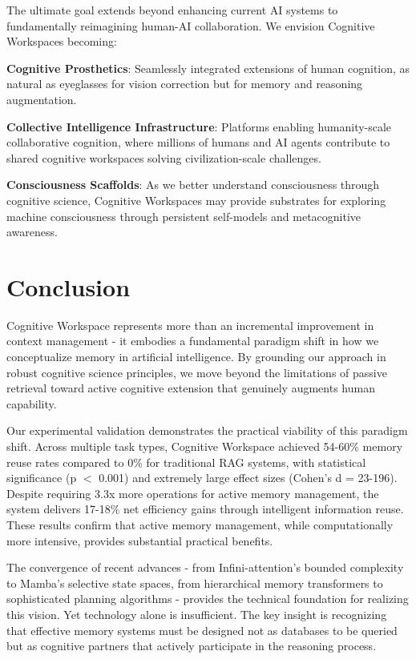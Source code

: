 \documentclass[10pt,twocolumn]{article}
\begin{document}
The ultimate goal extends beyond enhancing current AI systems to fundamentally reimagining human-AI collaboration. We envision Cognitive Workspaces becoming:

\textbf{Cognitive Prosthetics}: Seamlessly integrated extensions of human cognition, as natural as eyeglasses for vision correction but for memory and reasoning augmentation.

\textbf{Collective Intelligence Infrastructure}: Platforms enabling humanity-scale collaborative cognition, where millions of humans and AI agents contribute to shared cognitive workspaces solving civilization-scale challenges.

\textbf{Consciousness Scaffolds}: As we better understand consciousness through cognitive science, Cognitive Workspaces may provide substrates for exploring machine consciousness through persistent self-models and metacognitive awareness.

\section{Conclusion}

Cognitive Workspace represents more than an incremental improvement in context management - it embodies a fundamental paradigm shift in how we conceptualize memory in artificial intelligence. By grounding our approach in robust cognitive science principles, we move beyond the limitations of passive retrieval toward active cognitive extension that genuinely augments human capability.

Our experimental validation demonstrates the practical viability of this paradigm shift. Across multiple task types, Cognitive Workspace achieved 54-60\% memory reuse rates compared to 0\% for traditional RAG systems, with statistical significance (p $<$ 0.001) and extremely large effect sizes (Cohen's d = 23-196). Despite requiring 3.3x more operations for active memory management, the system delivers 17-18\% net efficiency gains through intelligent information reuse. These results confirm that active memory management, while computationally more intensive, provides substantial practical benefits.

The convergence of recent advances - from Infini-attention's bounded complexity to Mamba's selective state spaces, from hierarchical memory transformers to sophisticated planning algorithms - provides the technical foundation for realizing this vision. Yet technology alone is insufficient. The key insight is recognizing that effective memory systems must be designed not as databases to be queried but as cognitive partners that actively participate in the reasoning process.
\end{document}
